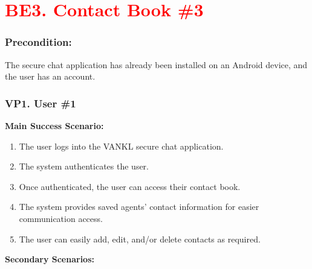 \documentclass[]{article}
\begin{document}
\section*{\textcolor{red}{BE3. Contact Book \#3}}
\subsubsection*{Precondition:} The secure chat application has already been installed on an Android device, and the user has an account.
\subsubsection*{VP1. User \#1}
\textbf{Main Success Scenario:}
\begin{enumerate}
	\item The user logs into the VANKL secure chat application.
	\item The system authenticates the user.
	\item Once authenticated, the user can access their contact book.
	\item The system provides saved agents’ contact information for easier communication access.
	\item The user can easily add, edit, and/or delete contacts as required.
\end{enumerate}
\textbf{Secondary Scenarios:}
\end{document}
